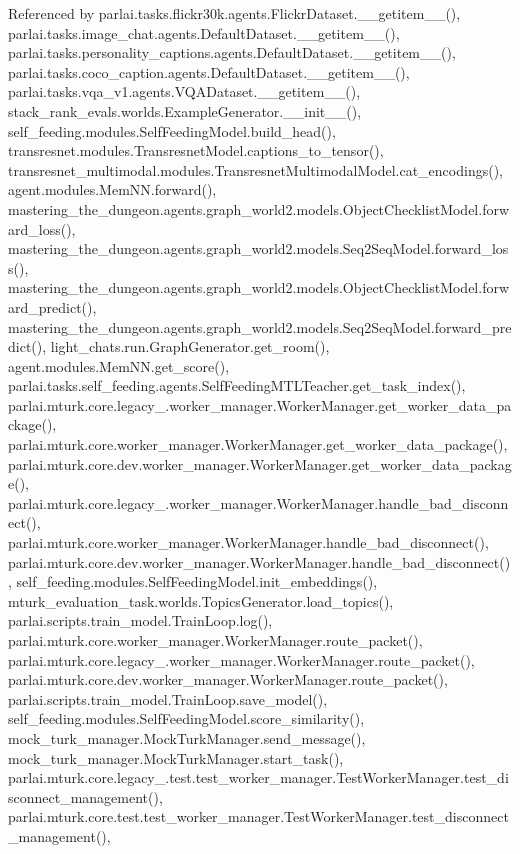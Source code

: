 Referenced by parlai.\+tasks.\+flickr30k.\+agents.\+Flickr\+Dataset.\+\_\+\+\_\+getitem\+\_\+\+\_\+(), parlai.\+tasks.\+image\+\_\+chat.\+agents.\+Default\+Dataset.\+\_\+\+\_\+getitem\+\_\+\+\_\+(), parlai.\+tasks.\+personality\+\_\+captions.\+agents.\+Default\+Dataset.\+\_\+\+\_\+getitem\+\_\+\+\_\+(), parlai.\+tasks.\+coco\+\_\+caption.\+agents.\+Default\+Dataset.\+\_\+\+\_\+getitem\+\_\+\+\_\+(), parlai.\+tasks.\+vqa\+\_\+v1.\+agents.\+V\+Q\+A\+Dataset.\+\_\+\+\_\+getitem\+\_\+\+\_\+(), stack\+\_\+rank\+\_\+evals.\+worlds.\+Example\+Generator.\+\_\+\+\_\+init\+\_\+\+\_\+(), self\+\_\+feeding.\+modules.\+Self\+Feeding\+Model.\+build\+\_\+head(), transresnet.\+modules.\+Transresnet\+Model.\+captions\+\_\+to\+\_\+tensor(), transresnet\+\_\+multimodal.\+modules.\+Transresnet\+Multimodal\+Model.\+cat\+\_\+encodings(), agent.\+modules.\+Mem\+N\+N.\+forward(), mastering\+\_\+the\+\_\+dungeon.\+agents.\+graph\+\_\+world2.\+models.\+Object\+Checklist\+Model.\+forward\+\_\+loss(), mastering\+\_\+the\+\_\+dungeon.\+agents.\+graph\+\_\+world2.\+models.\+Seq2\+Seq\+Model.\+forward\+\_\+loss(), mastering\+\_\+the\+\_\+dungeon.\+agents.\+graph\+\_\+world2.\+models.\+Object\+Checklist\+Model.\+forward\+\_\+predict(), mastering\+\_\+the\+\_\+dungeon.\+agents.\+graph\+\_\+world2.\+models.\+Seq2\+Seq\+Model.\+forward\+\_\+predict(), light\+\_\+chats.\+run.\+Graph\+Generator.\+get\+\_\+room(), agent.\+modules.\+Mem\+N\+N.\+get\+\_\+score(), parlai.\+tasks.\+self\+\_\+feeding.\+agents.\+Self\+Feeding\+M\+T\+L\+Teacher.\+get\+\_\+task\+\_\+index(), parlai.\+mturk.\+core.\+legacy\+\_.\+worker\+\_\+manager.\+Worker\+Manager.\+get\+\_\+worker\+\_\+data\+\_\+package(), parlai.\+mturk.\+core.\+worker\+\_\+manager.\+Worker\+Manager.\+get\+\_\+worker\+\_\+data\+\_\+package(), parlai.\+mturk.\+core.\+dev.\+worker\+\_\+manager.\+Worker\+Manager.\+get\+\_\+worker\+\_\+data\+\_\+package(), parlai.\+mturk.\+core.\+legacy\+\_.\+worker\+\_\+manager.\+Worker\+Manager.\+handle\+\_\+bad\+\_\+disconnect(), parlai.\+mturk.\+core.\+worker\+\_\+manager.\+Worker\+Manager.\+handle\+\_\+bad\+\_\+disconnect(), parlai.\+mturk.\+core.\+dev.\+worker\+\_\+manager.\+Worker\+Manager.\+handle\+\_\+bad\+\_\+disconnect(), self\+\_\+feeding.\+modules.\+Self\+Feeding\+Model.\+init\+\_\+embeddings(), mturk\+\_\+evaluation\+\_\+task.\+worlds.\+Topics\+Generator.\+load\+\_\+topics(), parlai.\+scripts.\+train\+\_\+model.\+Train\+Loop.\+log(), parlai.\+mturk.\+core.\+worker\+\_\+manager.\+Worker\+Manager.\+route\+\_\+packet(), parlai.\+mturk.\+core.\+legacy\+\_.\+worker\+\_\+manager.\+Worker\+Manager.\+route\+\_\+packet(), parlai.\+mturk.\+core.\+dev.\+worker\+\_\+manager.\+Worker\+Manager.\+route\+\_\+packet(), parlai.\+scripts.\+train\+\_\+model.\+Train\+Loop.\+save\+\_\+model(), self\+\_\+feeding.\+modules.\+Self\+Feeding\+Model.\+score\+\_\+similarity(), mock\+\_\+turk\+\_\+manager.\+Mock\+Turk\+Manager.\+send\+\_\+message(), mock\+\_\+turk\+\_\+manager.\+Mock\+Turk\+Manager.\+start\+\_\+task(), parlai.\+mturk.\+core.\+legacy\+\_.\+test.\+test\+\_\+worker\+\_\+manager.\+Test\+Worker\+Manager.\+test\+\_\+disconnect\+\_\+management(), parlai.\+mturk.\+core.\+test.\+test\+\_\+worker\+\_\+manager.\+Test\+Worker\+Manager.\+test\+\_\+disconnect\+\_\+management(), 
